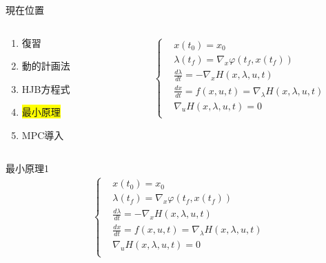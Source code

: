 \documentclass[twocolumn, dvipdfmx,12pt]{beamer}
\begin{document}
    \begin{frame}{現在位置}
        \footnotesize
        \begin{columns}
            \begin{column}{.35\textwidth}
                \begin{enumerate}
                    \item 復習
                    \item 動的計画法
                    \item HJB方程式
                    \item \colorbox{yellow}{最小原理}
                    \item MPC導入
                \end{enumerate}
            \end{column}
    
            \begin{column}{.7\textwidth}
                \begin{screen}
                    \begin{align*}
                        \begin{cases}
                            &x(t_0)=x_0 \\
                            &\lambda(t_f)=\nabla_x \varphi(t_f, x(t_f)) \\
                            &\frac{d\lambda}{dt}=-\nabla_x H(x, \lambda, u, t)\\
                            &\frac{dx}{dt}=f(x,u,t)=\nabla_\lambda H(x, \lambda, u, t) \\
                            &\nabla_u H(x, \lambda, u, t)=0 \\
                        \end{cases}  
                    \end{align*}
                \end{screen}
            \end{column}
        \end{columns}
    \end{frame}

    \begin{frame}{最小原理1}
        \footnotesize
        \begin{align*}
            \begin{cases}
                &x(t_0)=x_0 \\
                &\lambda(t_f)=\nabla_x \varphi(t_f, x(t_f)) \\
                &\frac{d\lambda}{dt}=-\nabla_x H(x, \lambda, u, t)\\
                &\frac{dx}{dt}=f(x,u,t)=\nabla_\lambda H(x, \lambda, u, t) \\
                &\nabla_u H(x, \lambda, u, t)=0 \\
            \end{cases}  
        \end{align*}
    \end{frame}
\end{document}
